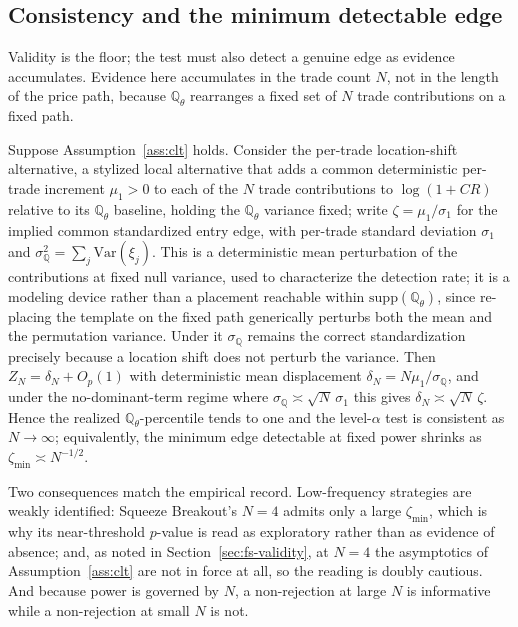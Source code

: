 \documentclass[risks,article,submit,pdftex,oneauthor]{Definitions/mdpi}
\begin{document}
\subsection{Consistency and the minimum detectable edge}
\label{sec:mde}

Validity is the floor; the test must also detect a genuine edge as evidence
accumulates. Evidence here accumulates in the trade count $N$, not in the length
of the price path, because $\mathbb{Q}_\theta$ rearranges a fixed set of $N$
trade contributions on a fixed path.

\begin{Theorem}
\label{prop:consistency}
Suppose Assumption~\ref{ass:clt} holds. Consider the per-trade location-shift
alternative, a stylized local alternative that adds a common deterministic
per-trade increment $\mu_1>0$ to each of the $N$ trade contributions to
$\log(1+CR)$ relative to its $\mathbb{Q}_\theta$ baseline, holding the
$\mathbb{Q}_\theta$ variance fixed; write $\zeta=\mu_1/\sigma_1$ for the implied
common standardized entry edge, with per-trade standard deviation $\sigma_1$ and
$\sigma_{\mathbb Q}^2=\sum_j\mathrm{Var}(\xi_j)$. This is a deterministic mean
perturbation of the contributions at fixed null variance, used to characterize
the detection rate; it is a modeling device rather than a placement reachable
within $\mathrm{supp}(\mathbb{Q}_\theta)$, since re-placing the template on the
fixed path generically perturbs both the mean and the permutation variance. Under
it $\sigma_{\mathbb Q}$ remains the correct standardization precisely because a
location shift does not perturb the variance. Then $Z_N=\delta_N+O_p(1)$ with
deterministic mean displacement $\delta_N=N\mu_1/\sigma_{\mathbb Q}$, and under the
no-dominant-term regime where $\sigma_{\mathbb Q}\asymp\sqrt N\,\sigma_1$ this
gives $\delta_N\asymp\sqrt N\,\zeta$. Hence the realized
$\mathbb{Q}_\theta$-percentile tends to one and the level-$\alpha$ test is
consistent as $N\to\infty$; equivalently, the minimum edge detectable at fixed
power shrinks as $\zeta_{\min}\asymp N^{-1/2}$.
\end{Theorem}

Two consequences match the empirical record. Low-frequency strategies are weakly
identified: Squeeze Breakout's $N=4$ admits only a large $\zeta_{\min}$, which is
why its near-threshold $p$-value is read as exploratory rather than as evidence of
absence; and, as noted in Section~\ref{sec:fs-validity}, at $N=4$ the
asymptotics of Assumption~\ref{ass:clt} are not in force at all, so the reading
is doubly cautious. And because power is governed by $N$, a non-rejection at
large $N$ is informative while a non-rejection at small $N$ is not.
\end{document}
